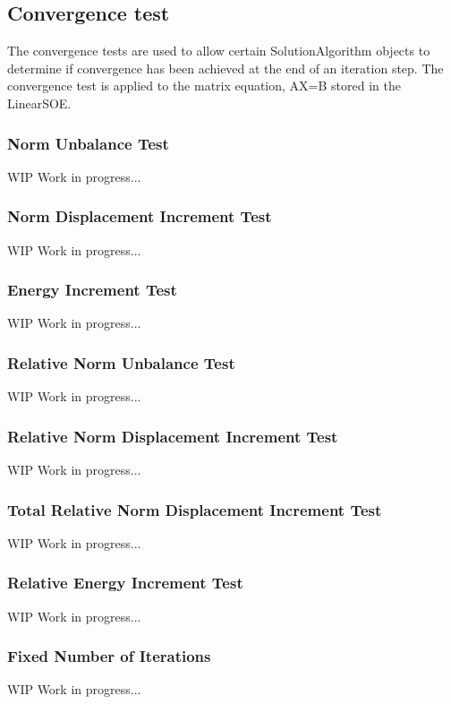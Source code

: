 \subsection{Convergence test}
The convergence tests are used to allow certain SolutionAlgorithm objects to determine if convergence has been achieved at the end of an iteration step. The convergence test is applied to the matrix equation, AX=B stored in the LinearSOE.



\subsubsection{Norm Unbalance Test}
WIP Work in progress...

\subsubsection{Norm Displacement Increment Test}
WIP Work in progress...

\subsubsection{Energy Increment Test}
WIP Work in progress...

\subsubsection{Relative Norm Unbalance Test}
WIP Work in progress...

\subsubsection{Relative Norm Displacement Increment Test}
WIP Work in progress...

\subsubsection{Total Relative Norm Displacement Increment Test}
WIP Work in progress...

\subsubsection{Relative Energy Increment Test}
WIP Work in progress...

\subsubsection{Fixed Number of Iterations}
WIP Work in progress...
    
